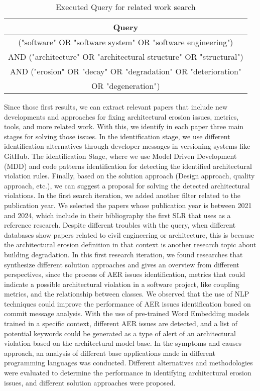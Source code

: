 \begin{table}[H]
    \centering
    \begin{tabular}{|c|}
        \hline
        Query\\
         \hline
             ("software" OR "software system" OR "software engineering") \\
             AND ("architecture" OR "architectural structure" OR "structural") \\
             AND ("erosion" OR "decay" OR "degradation" OR "deterioration"\\
             OR "degeneration") \\
         \hline
    \end{tabular}
    \caption{Executed Query for related work search}
    \label{tab:my_label}
\end{table}

Since those first results, we can extract relevant papers that include new developments and approaches for fixing architectural erosion issues, metrics, tools, and more related work. With this, we identify in each paper three main stages for solving those issues. In the identification stage, we use different identification alternatives through developer messages in versioning systems like GitHub. The identification Stage, where we use Model Driven Development (MDD) and code patterns identification for detecting the identified architectural violation rules. Finally, based on the solution approach (Design approach, quality approach, etc.), we can suggest a proposal for solving the detected architectural violations.
In the first search iteration, we added another filter related to the publication year. We selected the papers whose publication year is between 2021 and 2024, which include in their bibliography the first SLR that uses as a reference research. Despite different troubles with the query, when different databases show papers related to civil engineering or architecture, this is because the architectural erosion definition in that context is another research topic about building degradation. In this first research iteration, we found researches that synthesize different solution approaches and gives an overview from different perspectives, since the process of AER issues identification, metrics that could indicate a possible architectural violation in a software project, like coupling metrics, and the relationship between classes.
We observed that the use of NLP techniques could improve the performance of AER issues identification based on commit message analysis. With the use of pre-trained Word Embedding models trained in a specific context, different AER issues are detected, and a list of potential keywords could be generated as a type of alert of an architectural violation based on the architectural model base.
In the symptoms and causes approach, an analysis of different base applications made in different programming languages was conducted. Different alternatives and methodologies were evaluated to determine the performance in identifying architectural erosion issues, and different solution approaches were proposed.

